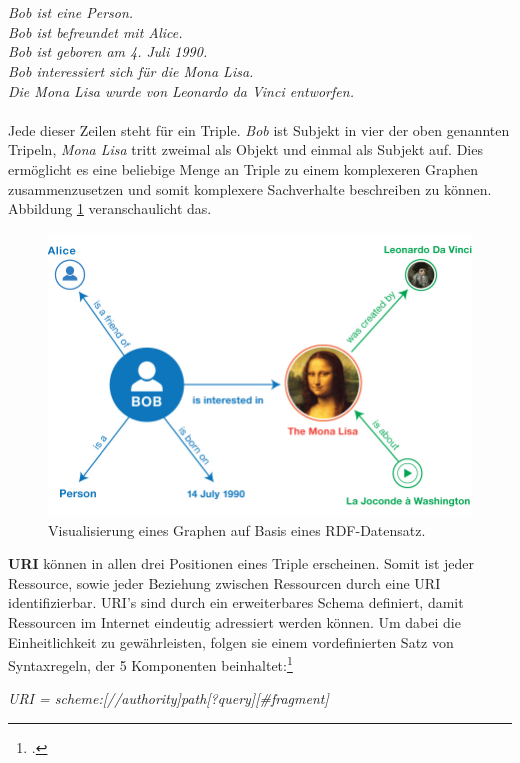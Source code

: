 \documentclass[12pt,a4paper]{article}
\begin{document}
\\
\\
\textit{Bob ist eine Person.\\
Bob ist befreundet mit Alice.\\
Bob ist geboren am 4. Juli 1990. \\
Bob interessiert sich für die Mona Lisa.\\
Die Mona Lisa wurde von Leonardo da Vinci entworfen.}
\\
\\
Jede dieser Zeilen steht für ein Triple. \textit{Bob} ist Subjekt in vier der oben genannten Tripeln, \textit{Mona Lisa} tritt zweimal als Objekt und einmal als Subjekt auf. Dies ermöglicht es eine beliebige Menge an Triple zu einem komplexeren Graphen zusammenzusetzen und somit komplexere Sachverhalte beschreiben zu können. Abbildung \ref{fig:rdf_example} veranschaulicht das.
\begin{figure}[H]
  \centering
	\includegraphics[width=1\textwidth]{img/rdf_example.png}  
    \caption[Visualisierung eines Graphen auf Basis eines RDF-Datensatz, \protect\url{w3.org/TR/rdf11-primer}, 10.04.2019.]{Visualisierung eines Graphen auf Basis eines RDF-Datensatz.}
  	\label{fig:rdf_example}
\end{figure}
\textbf{URI} können in allen drei Positionen eines Triple erscheinen. Somit ist jeder Ressource, sowie jeder Beziehung zwischen Ressourcen durch eine URI identifizierbar. URI's sind durch ein erweiterbares Schema definiert, damit Ressourcen im Internet eindeutig adressiert werden können. Um dabei die Einheitlichkeit zu gewährleisten, folgen sie einem vordefinierten Satz von Syntaxregeln, der 5 Komponenten beinhaltet:\footcite[][]{berners2004uniform}
\begin{center}
\textit{URI = scheme:[//authority]path[?query][\#fragment]}
\\
\end{center}
\end{document}
